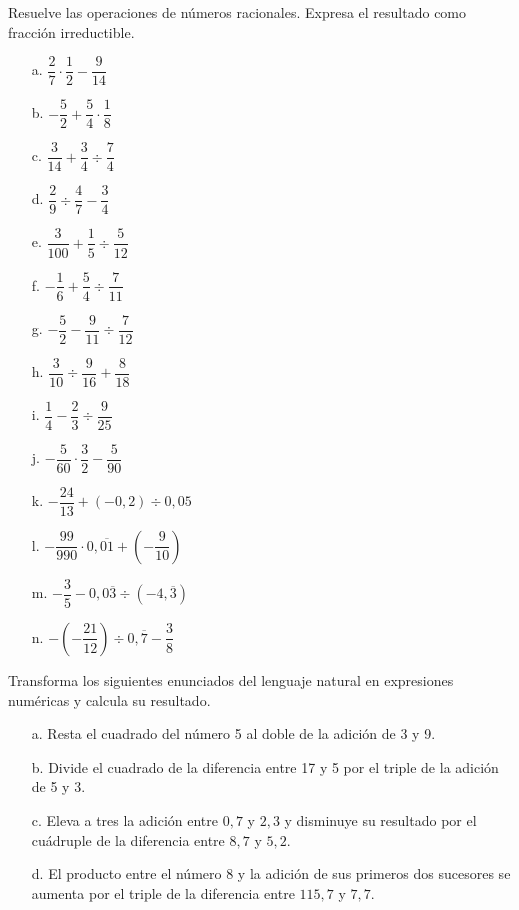 \documentclass[spanish,letterpaper, 11pt, addpoints, answers]{exam}
\begin{document}
\begin{questions}
  \question Resuelve las operaciones de números racionales. Expresa el resultado como fracción irreductible.
  \begin{multicols}{2}


    \begin{itemize}
      \item[a.] $\dfrac{2}{7}\cdot \dfrac{1}{2}-\dfrac{9}{14}$
      \item[b.] $-\dfrac{5}{2}+\dfrac{5}{4}\cdot \dfrac{1}{8}$
      \item[c.] $\dfrac{3}{14}+\dfrac{3}{4}\div \dfrac{7}{4}$
      \item[d.] $\dfrac{2}{9}\div \dfrac{4}{7}-\dfrac{3}{4}$
      \item[e.] $\dfrac{3}{100}+\dfrac{1}{5}\div \dfrac{5}{12}$
      \item[f.] $-\dfrac{1}{6}+\dfrac{5}{4}\div \dfrac{7}{11}$
      \item[g.] $-\dfrac{5}{2}-\dfrac{9}{11}\div \dfrac{7}{12}$
      \item[h.] $\dfrac{3}{10}\div \dfrac{9}{16}+\dfrac{8}{18}$
      \item[i.] $\dfrac{1}{4}-\dfrac{2}{3}\div \dfrac{9}{25}$
      \item[j.] $-\dfrac{5}{60}\cdot \dfrac{3}{2}-\dfrac{5}{90}$
      \item[k.] $-\dfrac{24}{13}+(-0{,}2)\div 0{,}05$
      \item[l.] $-\dfrac{99}{990}\cdot 0{,}\overline{01}+\left(-\dfrac{9}{10}\right)$
      \item[m.] $-\dfrac{3}{5}-0{,}0\overline{3}\div \left(-4{,}\overline{3}\right)$
      \item[n.] $-\left(-\dfrac{21}{12}\right)\div 0{,}\overline{7}-\dfrac{3}{8}$
    \end{itemize}
  \end{multicols}

  \question Transforma los siguientes enunciados del lenguaje natural en expresiones numéricas y calcula su resultado.

  \begin{itemize}
    \item[a.] Resta el cuadrado del número 5 al doble de la adición de 3 y 9.
    \item[b.] Divide el cuadrado de la diferencia entre 17 y 5 por el triple de la adición de 5 y 3.
    \item[c.] Eleva a tres la adición entre $0{,}7$ y $2{,}3$ y disminuye su resultado por el cuádruple de la diferencia entre $8{,}7$ y $5{,}2$.
    \item[d.] El producto entre el número 8 y la adición de sus primeros dos sucesores se aumenta por el triple de la diferencia entre $115{,}7$ y $7{,}7$.
  \end{itemize}


\end{questions}
\end{document}
